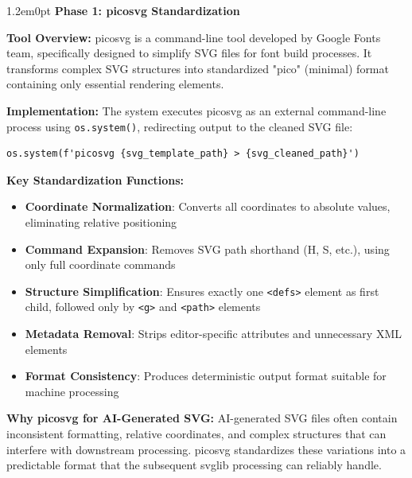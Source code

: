\documentclass[10pt,a4paper]{article}
\newenvironment{bodytext}{\begin{adjustwidth}{1.2em}{0pt}}{\end{adjustwidth}}
\begin{document}
\begin{bodytext}
\textbf{Phase 1: picosvg Standardization}

\textcolor{green!40!black}{\textbf{Tool Overview:}} picosvg is a command-line tool developed by Google Fonts team, specifically designed to simplify SVG files for font build processes. It transforms complex SVG structures into standardized "pico" (minimal) format containing only essential rendering elements.

\textcolor{green!40!black}{\textbf{Implementation:}} The system executes picosvg as an external command-line process using \texttt{os.system()}, redirecting output to the cleaned SVG file:
\begin{verbatim}
os.system(f'picosvg {svg_template_path} > {svg_cleaned_path}')
\end{verbatim}

\textcolor{green!40!black}{\textbf{Key Standardization Functions:}}
\begin{itemize}
\item \textbf{Coordinate Normalization}: Converts all coordinates to absolute values, eliminating relative positioning
\item \textbf{Command Expansion}: Removes SVG path shorthand (H, S, etc.), using only full coordinate commands
\item \textbf{Structure Simplification}: Ensures exactly one \texttt{<defs>} element as first child, followed only by \texttt{<g>} and \texttt{<path>} elements
\item \textbf{Metadata Removal}: Strips editor-specific attributes and unnecessary XML elements
\item \textbf{Format Consistency}: Produces deterministic output format suitable for machine processing
\end{itemize}

\textcolor{green!40!black}{\textbf{Why picosvg for AI-Generated SVG:}} AI-generated SVG files often contain inconsistent formatting, relative coordinates, and complex structures that can interfere with downstream processing. picosvg standardizes these variations into a predictable format that the subsequent svglib processing can reliably handle.
\end{bodytext}
\end{document}
